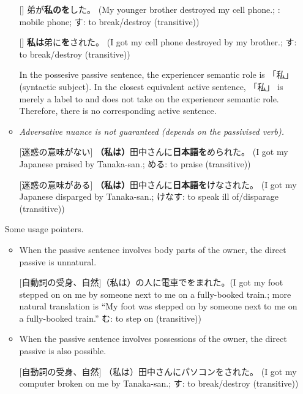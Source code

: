 \documentclass[../nihongo-gakushuu-kyouzai.tex]{subfiles}
\begin{document}
\begin{enumerate}[label=\arabic*.]
\begin{itemize}
        [] 弟が\textbf{私のを}した。 (My younger brother destroyed my cell phone.; : mobile phone; す: to break/destroy (transitive))

        [] \textbf{私は}弟に\textbf{を}された。 (I got my cell phone destroyed by my brother.; す: to break/destroy (transitive))

        In the possesive passive sentence, the experiencer semantic role is 「私」 (syntactic subject). In the closest equivalent active sentence, 「私」 is merely a label to  and does not take on the experiencer semantic role. Therefore, there is no corresponding active sentence.

        \item \emph{Adversative nuance is not guaranteed (depends on the passivised verb).}

        [迷惑の意味がない] \textbf{（私は）}田中さんに\textbf{日本語を}められた。 (I got my Japanese praised by Tanaka-san.; める: to praise (transitive))

        [迷惑の意味がある] \textbf{（私は）}田中さんに\textbf{日本語を}けなされた。 (I got my Japanese disparged by Tanaka-san.; けなす: to speak ill of/disparage (transitive))
    \end{itemize}

    Some usage pointers.

    \begin{itemize}
        \item When the passive sentence involves body parts of the owner, the direct passive is unnatural.

        [自動詞の受身、自然]（私は）の人に電車でをまれた。(I got my foot stepped on on me by someone next to me on a fully-booked train.; more natural translation is ``My foot was stepped on by someone next to me on a fully-booked train.'' む: to step on (transitive))


        \item When the passive sentence involves possessions of the owner, the direct passive is also possible.

        [自動詞の受身、自然] （私は）田中さんにパソコンをされた。 (I got my computer broken on me by Tanaka-san.; す: to break/destroy (transitive))


\end{itemize}
\end{enumerate}
\end{document}
